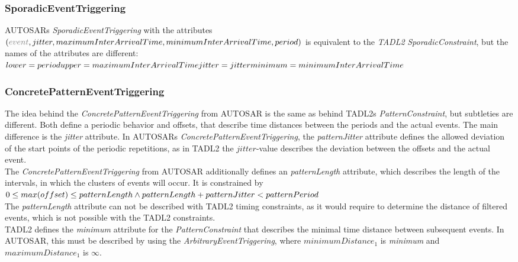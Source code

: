 	\subsubsection{SporadicEventTriggering}
		AUTOSARs \emph{SporadicEventTriggering} with the attributes\\
		 $(\textcolor{gray}{event}, jitter, maximumInterArrivalTime,  minimumInterArrivalTime, period)$ is equivalent to the \emph{TADL2} \emph{SporadicConstraint}, but the names of the attributes are different:\\
		\begin{math}
			lower=period\\
			upper=maximumInterArrivalTime\\
			jitter=jitter\\
			minimum=minimumInterArrivalTime
		\end{math}
	
	\subsubsection{ConcretePatternEventTriggering}
		The idea behind the \emph{ConcretePatternEventTriggering} from AUTOSAR is the same as behind TADL2s \emph{PatternConstraint}, but subtleties are different. Both define a periodic behavior and offsets, that describe time distances between the periods and the actual events. The main difference is the \emph{jitter} attribute. In AUTOSARs \emph{ConcretePatternEventTriggering}, the \emph{patternJitter} attribute defines the allowed deviation of the start points of the periodic repetitions, as in TADL2 the $jitter$-value describes the deviation between the offsets and the actual event.\\
		The \emph{ConcretePatternEventTriggering} from AUTOSAR additionally defines an \emph{patternLength} attribute, which describes the length of the intervals, in which the clusters of events will occur. It is constrained by\\[10pt]
		\begin{math}
			0\leq max(offset)\leq patternLength\\
			\land patternLength + patternJitter < patternPeriod
		\end{math}\\[10pt]
		The \emph{patternLength} attribute can not be described with TADL2 timing constraints, as it would require to determine the distance of filtered events, which is not possible with the TADL2 constraints.\\
		TADL2 defines the \emph{minimum} attribute for the \emph{PatternConstraint} that describes the minimal time distance between subsequent events. In AUTOSAR, this must be described by using the \emph{ArbitraryEventTriggering}, where $minimumDistance_1$ is \emph{minimum} and $maximumDistance_1$ is $\infty$.
		
